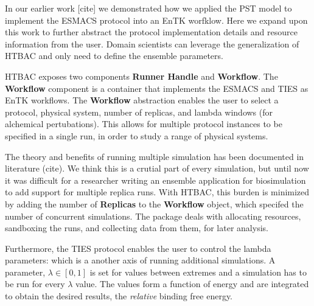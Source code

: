 	In our earlier work [cite] we demonstrated how we applied the PST model to implement 
the ESMACS protocol into an EnTK worfklow. Here we expand upon this work to further 
abstract the protocol implementation details and resource information from the user.
Domain scientists can leverage the generalization of HTBAC and only need to define 
the ensemble parameters. 

	HTBAC exposes two components \textbf{Runner Handle} and 
\textbf{Workflow}. The \textbf{Workflow} component is a container that implements the 
ESMACS and TIES as EnTK workflows. The \textbf{Workflow} abstraction enables the user to
select a protocol, physical system, number of replicas, and lambda windows 
(for alchemical pertubations). This allows for multiple protocol instances to be 
specified in a single run, in order to study a range of physical systems. 

	The theory and benefits of  running multiple simulation has been documented in 
literature (cite). We think this is a crutial part of every simulation, but until 
now it was difficult for a researcher writing an ensemble application for biosimulation 
to add support for multiple replica runs. With HTBAC, this burden is minimized by 
adding the number of \textbf{Replicas} to the \textbf{Workflow} object, which 
specifed the number of concurrent simulations. The package deals with allocating 
resources, sandboxing the runs, and collecting data from them, for later analysis.

	Furthermore, the TIES protocol enables the user to control the lambda parameters:
which is a another axis of running additional simulations. 
A parameter, $\lambda \in [0, 1]$ is set for values between extremes and a 
simulation has to be run for every $\lambda$ value. The values form a 
function of energy and are integrated to obtain the desired results, 
the \emph{relative} binding free energy.






